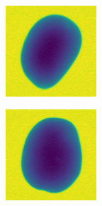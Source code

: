 \documentclass[11pt]{article}
\begin{document}
\begin{figure}[!h]
\begin{subfigure}[b]{0.22\textwidth}
         \caption{}
         \label{fig:perfect_27}
     \end{subfigure}
          \\
    \begin{subfigure}[b]{0.22\textwidth}
         \centering
         \includegraphics[width=\textwidth]{figurer/potato_dataset/perfect/perfect_28.jpg}
         \caption{}
         \label{fig:perfect_28}
     \end{subfigure}
     \hfill
     \begin{subfigure}[b]{0.22\textwidth}
         \centering
         \includegraphics[width=\textwidth]{figurer/potato_dataset/perfect/perfect_29.jpg}

\end{subfigure}
\end{figure}
\end{document}
